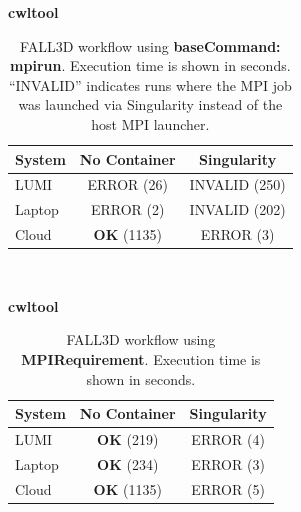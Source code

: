 \documentclass{article}
\begin{document}
\begin{table}[ht!]
\centering
\renewcommand{\arraystretch}{1.2}
\textbf{cwltool}\\[0.2cm]
\begin{tabular}{|l|c|c|}
\hline
\rowcolor{lightgray!50}
\textbf{System} & \textbf{No Container} & \textbf{Singularity} \\
\hline
LUMI & ERROR (26) & INVALID (250) \\
Laptop & ERROR (2) & INVALID (202) \\
Cloud & \textbf{OK} (1135) & ERROR (3) \\
\hline
\end{tabular}
\\[0.6cm]
\caption{FALL3D workflow using \protect\textbf{baseCommand: mpirun}. Execution time is shown in seconds. “INVALID” indicates runs where the MPI job was launched via Singularity instead of the host MPI launcher.}
\label{table:workflow-base_fall3d}
\end{table}

\begin{table}[ht!]
\centering
\renewcommand{\arraystretch}{1.2}
\textbf{cwltool}\\[0.2cm]
\begin{tabular}{|l|c|c|}
\hline
\rowcolor{lightgray!50}
\textbf{System} & \textbf{No Container} & \textbf{Singularity} \\
\hline
LUMI & \textbf{OK} (219) & ERROR (4) \\
Laptop & \textbf{OK} (234) & ERROR (3) \\
Cloud & \textbf{OK} (1135) & ERROR (5) \\
\hline
\end{tabular}
\\[0.6cm]
\caption{FALL3D workflow using \protect\textbf{MPIRequirement}. Execution time is shown in seconds.}
\label{table:workflow-req_fall3d}
\end{table}
\end{document}
